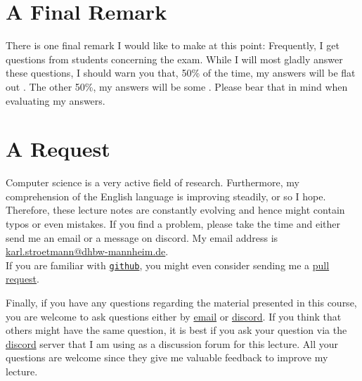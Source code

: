 \section{A Final Remark}
There is one final remark I would like to make at this point:  Frequently, I get questions from
students concerning the exam.  While I will most gladly answer these questions, I should warn you
that, 50\%  
of the time, my answers will be flat out .  The other 50\%,
my answers will be some .  Please bear that in mind when evaluating my answers.
\pagebreak

\section{A Request}
Computer science is a very active field of research.  Furthermore, my comprehension of the English
language is improving steadily, or so I hope.  Therefore, these lecture notes are constantly
evolving and hence might contain typos or even mistakes.  If you find a problem,
please take the time and either send me an email or a message on discord.  My email address is
\\[0.2cm]
\hspace*{1.3cm}
\href{mailto:karl.stroetmann@dhbw-mannheim.de}{karl.stroetmann@dhbw-mannheim.de}.
\\[0.2cm]
If you are familiar with \href{http://github.com}{\texttt{github}}, you might even consider
sending me a \href{https://help.github.com/articles/using-pull-requests}{pull request}.

Finally, if you have any questions regarding the material presented in this course, you are
welcome to ask questions either by \href{mailto:karl.stroetmann@dhbw-mannheim.de}{email} or
\href{https://discordapp.com}{discord}.  If you think that others might
have the same question, it is best if you ask your question via the \href{https://discordapp.com}{discord}
server that I am using as a discussion forum for this lecture.  All your questions are welcome since they give
me valuable feedback   to improve my lecture. 


